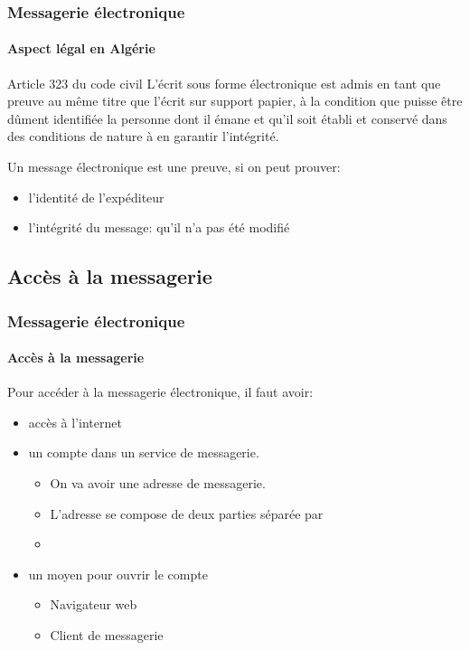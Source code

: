 \documentclass[xcolor=table]{beamer}
\begin{document}
\begin{frame}
\frametitle{Messagerie électronique}
\framesubtitle{Aspect légal en Algérie}


\begin{block}{Article 323 du code civil}
	L'écrit sous forme électronique est admis en tant que preuve au même titre que l'écrit sur support papier, à la condition que puisse être dûment identifiée la personne dont il émane et qu’il soit établi et conservé dans des conditions de nature à en garantir l'intégrité.
\end{block}

Un message électronique est une preuve, si on peut prouver: 
\begin{itemize}
	\item l'identité de l'expéditeur 
	\item l'intégrité du message: qu'il n'a pas été modifié 
\end{itemize} 

\end{frame}

\subsection{Accès à la messagerie}

\begin{frame}
\frametitle{Messagerie électronique}
\framesubtitle{Accès à la messagerie}

Pour accéder à la messagerie électronique, il faut avoir:
\begin{itemize}
	\item accès à l'internet
	\item un compte dans un service de messagerie.  
	\begin{itemize}
		\item On va avoir une adresse de messagerie.
		\item L'adresse se compose de deux parties séparée par 
		\item {}
	\end{itemize}
	\item un moyen pour ouvrir le compte
	\begin{itemize}
		\item Navigateur web
		\item Client de messagerie 
	\end{itemize}
\end{itemize}

\end{frame}
\end{document}
